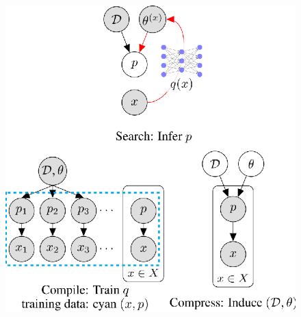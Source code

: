 \documentclass{article}
\begin{document}
\begin{figure}[h]
\centering
  \includegraphics{figures/iterations.eps}


\end{figure}
\end{document}
